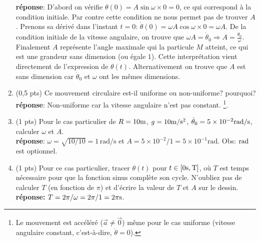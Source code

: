 \documentclass[french,10pt]{article}
\begin{document}
\begin{enumerate}
	\textbf{réponse}: D'abord on vérifie $\theta(0) = A \sin{\omega \times 0} = 0$, ce qui correspond à la condition initiale. Par contre cette condition ne nous permet pas de trouver $A$. Prenons sa dérivé dans l'instant $t=0$: $\dot{\theta}(0) = \omega A \cos{\omega \times 0} = \omega A$. De la condition initiale de la vitesse angulaire, on trouve que $\omega A = \dot{\theta}_0 \Rightarrow \boxed{A = \frac{\dot{\theta}_0}{\omega}}$. Finalement $A$ représente l'angle maximale qui la particule $M$ atteint, ce qui est une grandeur sans dimension (ou égale $1$). Cette interprétation vient directement de l'expression de $\theta(t)$. Alternativement on trouve que $A$ est sans dimension car $\dot{\theta}_0$ et $\omega$ ont les mêmes dimensions.
	\item (0,5 pts) Ce mouvement circulaire est-il uniforme ou non-uniforme? pourquoi? \\
	\textbf{réponse}: Non-uniforme car la vitesse angulaire n'est pas constant. \footnote{Le mouvement est accéléré ($\vec{a} \neq \vec{0}$) même pour le cas uniforme (vitesse angulaire constant, c'est-à-dire, $\ddot{\theta} = 0$).}.   
	\item (1 pts) Pour le cas particulier de $R = 10 \rm m$, $g = 10 \rm{m/s^2}$, $\dot{\theta}_0 = 5\times 10^{-2} \rm{rad/s}$, calculer $\omega$ et $A$. \\
	\textbf{réponse}: $ \omega = \sqrt{10/10} = \boxed{1 \, \textrm{rad/s} }$ et $A = 5 \times 10^{-2}/1 = \boxed{5\times 10^{-1} \textrm{rad}}$. Obs: $\rm rad$ est optionnel.
	
	\item (1 pts) Pour ce cas particulier, tracer $\theta(t)$ pour $t \in [0 \rm s,T]$, où $T$ est temps nécessaire pour que la fonction sinus complète son cycle. N'oubliez pas de calculer $T$ (en fonction de $\pi$) et d'écrire la valeur de $T$ et $A$ sur le dessin. \\
	\textbf{réponse:} $T = 2\pi/\omega = 2\pi/ 1 = 2\pi \rm s$. \\


\end{enumerate}
\end{document}
